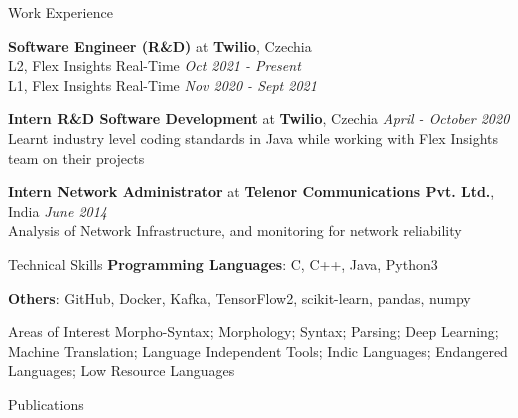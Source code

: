 \documentclass{resume}
\begin{document}
\begin{rSection}{Work Experience}

    {\textbf{Software Engineer (R\&D)} at \textbf{Twilio}, Czechia}\\
            L2, Flex Insights Real-Time \hfill \textit{Oct 2021 - Present}\\
            L1, Flex Insights Real-Time \hfill \textit{Nov 2020 - Sept 2021}
            
    {\textbf{Intern R\&D Software Development} at \textbf{Twilio}, Czechia}
        \hfill {\em April - October 2020}\\
            Learnt industry level coding standards in Java while working with Flex Insights team on their projects

    {\textbf{Intern Network Administrator} at \textbf{Telenor Communications Pvt. Ltd.}, India}
        \hfill {\em June 2014}\\
            Analysis of Network Infrastructure, and monitoring for 
            network reliability

\end{rSection}



\begin{rSection}{Technical Skills}
    {\textbf{Programming Languages}: C, C++, Java, Python3}
    
    {\textbf{Others}: GitHub, Docker, Kafka, TensorFlow2, scikit-learn, pandas, numpy}
    
    \begin{rSubsection}{Areas of Interest}{}{}{}
        Morpho-Syntax; Morphology; Syntax; Parsing; Deep Learning; Machine Translation; 
        Language Independent Tools; Indic Languages; Endangered Languages; Low Resource 
        Languages
    \end{rSubsection}
\end{rSection}


\begin{rSection}{Publications}

    {}
    
    {}

    {}

    {}
    
    \newpage
    {}

    {}

\end{rSection}
\end{document}
